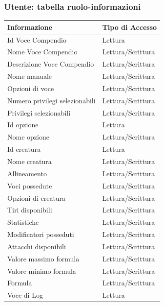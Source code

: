 \documentclass[a4paper, 11pt]{article}
\begin{document}
\subsubsection*{Utente: tabella ruolo-informazioni}
\begin{adjustwidth}{-0.5cm}{-0.5cm}
    \begin{tabular}{|p{5cm}|p{5cm}|}
        \hline
        \textbf{Informazione} & \textbf{Tipo di Accesso} \\
        \hline
        Id Voce Compendio& Lettura \\
        \hline
        Nome Voce Compendio& Lettura/Scrittura \\
        \hline
        Descrizione Voce Compendio& Lettura/Scrittura \\
        \hline
        Nome manuale & Lettura/Scrittura \\
        \hline
        Opzioni di voce & Lettura/Scrittura \\
        \hline
        Numero privilegi selezionabili & Lettura/Scrittura \\
        \hline
        Privilegi selezionabili & Lettura/Scrittura \\
        \hline
        Id opzione & Lettura \\
        \hline
        Nome opzione & Lettura/Scrittura \\
        \hline
        Id creatura & Lettura \\
        \hline
        Nome creatura & Lettura/Scrittura \\
        \hline
        Allineamento & Lettura/Scrittura \\
        \hline
        Voci possedute & Lettura/Scrittura \\
        \hline
        Opzioni di creatura & Lettura/Scrittura \\
        \hline
        Tiri disponibili & Lettura/Scrittura \\
        \hline
        Statistiche & Lettura/Scrittura \\
        \hline
        Modificatori posseduti & Lettura/Scrittura \\
        \hline
        Attacchi disponibili & Lettura/Scrittura \\
        \hline
        Valore massimo formula & Lettura/Scrittura \\
        \hline
        Valore minimo formula & Lettura/Scrittura \\
        \hline
        Formula & Lettura/Scrittura \\
        \hline
        Voce di Log & Lettura \\
        \hline
    \end{tabular}
\end{adjustwidth}
\end{document}
